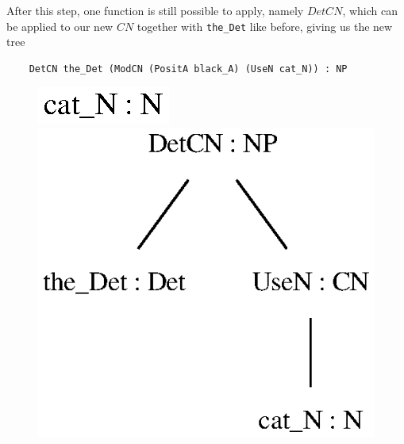 After this step, one function is still possible to apply, namely $DetCN$, which can be applied to our new $CN$ together with \lstinline{the_Det} like before, giving us the new tree
\begin{lstlisting}
    DetCN the_Det (ModCN (PositA black_A) (UseN cat_N)) : NP
\end{lstlisting}

\begin{figure}
    \centering
        {\includegraphics[scale=0.6]{thesis/figure/black_cats/cat_N_gf.eps}}\\
        {\includegraphics[scale=0.6]{thesis/figure/black_cats/the_cat_NP_gf.eps}}

\end{figure}
